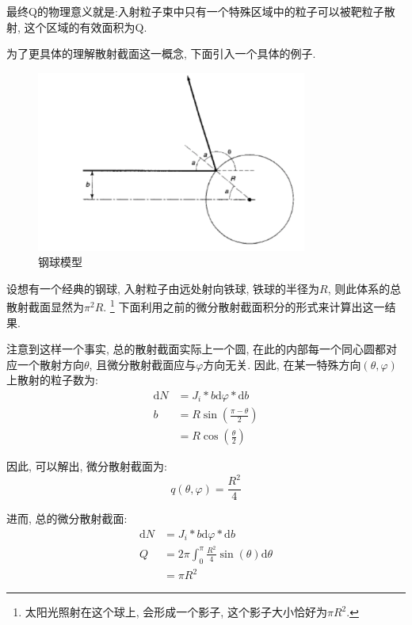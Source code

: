 \documentclass[a4paper, 11pt]{article}
\begin{document}
\begin{spacing}{1.2}
          最终Q的物理意义就是:入射粒子束中只有一个特殊区域中的粒子可以被靶粒子散射, 这个区域的有效面积为Q. 

          为了更具体的理解散射截面这一概念, 下面引入一个具体的例子. 

          \begin{figure}
            \centering\includegraphics[width=3.5in]{image/iron_ball_model}
            \caption{钢球模型}\label{iron_ball_model} 
          \end{figure}
          
          设想有一个经典的钢球, 入射粒子由远处射向铁球, 铁球的半径为$R$, 则此体系的总散射截面显然为$\pi^2R$.
          \footnote{太阳光照射在这个球上, 会形成一个影子, 这个影子大小恰好为$\pi{}R^2$.}
          下面利用之前的微分散射截面积分的形式来计算出这一结果. 

          注意到这样一个事实, 总的散射截面实际上一个圆, 在此的内部每一个同心圆都对应一个散射方向$\theta$, 
          且微分散射截面应与$\varphi$方向无关. 因此, 在某一特殊方向$(\theta, \varphi)$上散射的粒子数为:
          \begin{equation}
            \begin{aligned}
              \mathrm{d}N &= J_i * b\mathrm{d}\varphi * \mathrm{d}b\\
              b &= R\sin(\frac{\pi-\theta}{2})\\
                &= R\cos(\frac{\theta}{2})
            \end{aligned}
          \end{equation}

          因此, 可以解出, 微分散射截面为:
          \begin{equation}
            q(\theta, \varphi) = \frac{R^2}{4}
          \end{equation}

          进而, 总的微分散射截面: 
          \begin{equation}
            \begin{aligned}
              \mathrm{d}N &= J_i * b\mathrm{d}\varphi * \mathrm{d}b\\
              Q &= 2\pi\int_0^{\pi}\frac{R^2}{4}\sin(\theta)\mathrm{d}\theta\\
              &= \pi{}R^2    
            \end{aligned}
          \end{equation}


\end{spacing}
\end{document}
